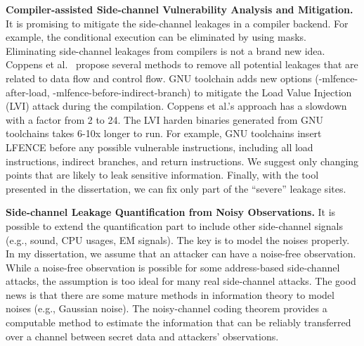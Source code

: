 \textbf{Compiler-assisted Side-channel Vulnerability Analysis and Mitigation.}
It is promising to mitigate the side-channel leakages in a compiler backend. For example, the conditional execution can be eliminated by using masks. Eliminating side-channel leakages from compilers is not a brand new idea. Coppens et al.~\cite{Coppens:2009:PMT:1607723.1608124} propose several methods to remove all potential leakages that are related to data flow and control flow.  GNU toolchain adds new options (\textsf{-mlfence-after-load}, \textsf{-mlfence-before-indirect-branch}) to mitigate the Load Value Injection (LVI) attack during the compilation. Coppens et al.'s approach has a slowdown with a factor from 2 to 24. The LVI harden binaries generated from GNU toolchains takes 6-10x longer to run.  For example, GNU toolchains insert LFENCE before any possible vulnerable instructions, including all load instructions, indirect branches, and return instructions. We suggest only changing points that are likely to leak sensitive information. Finally, with the tool presented in the dissertation, we can fix only part of the ``severe'' leakage sites.

\textbf{Side-channel Leakage Quantification from Noisy Observations.} It is possible to extend the quantification part to include other side-channel
signals (e.g., sound, CPU usages, EM signals). The key is to model the noises
properly. In my dissertation, we assume that an attacker can have a noise-free
observation. While a noise-free observation is possible for some address-based
side-channel attacks, the assumption is too ideal for many real side-channel
attacks. The good news is that there are some mature methods in information theory to model noises (e.g., Gaussian noise). The noisy-channel coding theorem provides a
computable method to estimate the information that can be reliably transferred over a channel between secret data and attackers' observations. 
